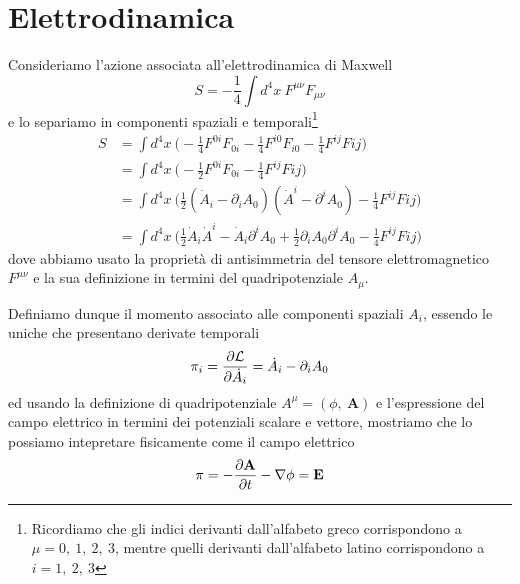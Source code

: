 \section{Elettrodinamica} 

    Consideriamo l'azione associata all'elettrodinamica di Maxwell
    \begin{equation*}
        S = - \frac{1}{4} \int d^4 x ~ F^{\mu\nu} F_{\mu\nu}
    \end{equation*}
    e lo separiamo in componenti spaziali e temporali\footnote{Ricordiamo che gli indici derivanti dall'alfabeto greco corrispondono a $\mu = 0, ~1, ~2, ~3$, mentre quelli derivanti dall'alfabeto latino corrispondono a $i = 1, ~2, ~3$}
    \begin{equation*}
    \begin{aligned}
        S & = \int d^4 x ~ \Big ( -\frac{1}{4} F^{0i}F_{0i} - \frac{1}{4} F^{i0}F_{i0} - \frac{1}{4} F^{ij} F{ij} \Big) \\ & = \int d^4 x ~ \Big ( -\frac{1}{2} F^{0i}F_{0i} - \frac{1}{4} F^{ij} F{ij} \Big) \\ & = \int d^4 x ~ \Big( \frac{1}{2} (\dot A_i - \partial_i A_0) (\dot A^i - \partial^i A_0) - \frac{1}{4} F^{ij} F{ij} \Big ) \\ & = \int d^4 x ~ \Big (\frac{1}{2} \dot A_i \dot A^i - \dot A_i \partial^i A_0 + \frac{1}{2} \partial_i A_0 \partial^i A_0 - \frac{1}{4} F^{ij} F{ij} \Big )
    \end{aligned}
    \end{equation*}
    dove abbiamo usato la proprietà di antisimmetria del tensore elettromagnetico $F^{\mu\nu}$ e la sua definizione in termini del quadripotenziale $A_\mu$.

    Definiamo dunque il momento associato alle componenti spaziali $A_i$, essendo le uniche che presentano derivate temporali
    \begin{equation} \label{momele}
        \pi_i = \frac{\partial\mathcal L}{\partial\dot A_i} = \dot A_i - \partial_i A_0
    \end{equation}
    ed usando la definizione di quadripotenziale $A^\mu = (\phi, ~ \mathbf A)$ e l'espressione del campo elettrico in termini dei potenziali scalare e vettore, mostriamo che lo possiamo intepretare fisicamente come il campo elettrico
    \begin{equation*}
        \mathbf \pi = - \frac{\partial\mathbf A}{\partial t} - \nabla \phi = \mathbf E
    \end{equation*}
    
